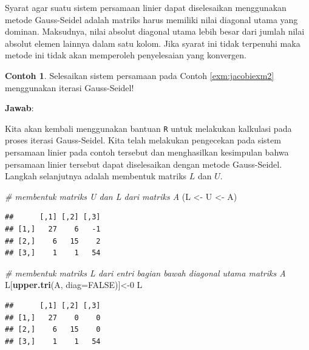 \documentclass[
]{book}
\newenvironment{Shaded}{\begin{snugshade}}{\end{snugshade}}
\newcommand{\AttributeTok}[1]{\textcolor[rgb]{0.13,0.29,0.53}{#1}}
\newcommand{\CommentTok}[1]{\textcolor[rgb]{0.56,0.35,0.01}{\textit{#1}}}
\newcommand{\ConstantTok}[1]{\textcolor[rgb]{0.56,0.35,0.01}{#1}}
\newcommand{\DecValTok}[1]{\textcolor[rgb]{0.00,0.00,0.81}{#1}}
\newcommand{\FunctionTok}[1]{\textcolor[rgb]{0.13,0.29,0.53}{\textbf{#1}}}
\newcommand{\NormalTok}[1]{#1}
\newcommand{\OtherTok}[1]{\textcolor[rgb]{0.56,0.35,0.01}{#1}}
\theoremstyle{definition}
\theoremstyle{definition}
\newtheorem{example}{Contoh}[chapter]
\theoremstyle{definition}
\theoremstyle{definition}
\theoremstyle{remark}
\begin{document}
Syarat agar suatu sistem persamaan linier dapat diselesaikan menggunakan metode Gauss-Seidel adalah matriks harus memiliki nilai diagonal utama yang dominan. Maksudnya, nilai absolut diagonal utama lebih besar dari jumlah nilai absolut elemen lainnya dalam satu kolom. Jika syarat ini tidak terpenuhi maka metode ini tidak akan memperoleh penyelesaian yang konvergen.

\begin{example}
\protect\hypertarget{exm:gaussseidelexm}{}\label{exm:gaussseidelexm}Selesaikan sistem persamaan pada Contoh \ref{exm:jacobiexm2} menggunakan iterasi Gauss-Seidel!
\end{example}

\textbf{Jawab}:

Kita akan kembali menggunakan bantuan \texttt{R} untuk melakukan kalkulasi pada proses iterasi Gauss-Seidel. Kita telah melakukan pengecekan pada sistem persamaan linier pada contoh tersebut dan menghasilkan kesimpulan bahwa persamaan linier tersebut dapat diselesaikan dengan metode Gauss-Seidel. Langkah selanjutnya adalah membentuk matriks \(L\) dan \(U\).

\begin{Shaded}
\begin{Highlighting}[]
\CommentTok{\# membentuk matriks U dan L dari matriks A}
\NormalTok{(L }\OtherTok{\textless{}{-}}\NormalTok{ U }\OtherTok{\textless{}{-}}\NormalTok{ A)}
\end{Highlighting}
\end{Shaded}

\begin{verbatim}
##      [,1] [,2] [,3]
## [1,]   27    6   -1
## [2,]    6   15    2
## [3,]    1    1   54
\end{verbatim}

\begin{Shaded}
\begin{Highlighting}[]
\CommentTok{\# membentuk matriks L dari entri bagian bawah diagonal utama matriks A}
\NormalTok{L[}\FunctionTok{upper.tri}\NormalTok{(A, }\AttributeTok{diag=}\ConstantTok{FALSE}\NormalTok{)]}\OtherTok{\textless{}{-}}\DecValTok{0}
\NormalTok{L}
\end{Highlighting}
\end{Shaded}

\begin{verbatim}
##      [,1] [,2] [,3]
## [1,]   27    0    0
## [2,]    6   15    0
## [3,]    1    1   54
\end{verbatim}
\end{document}
